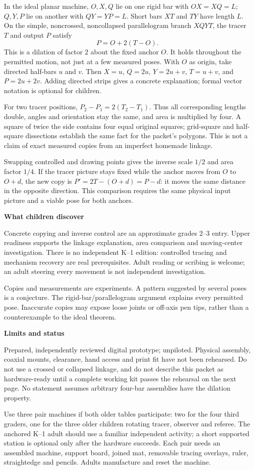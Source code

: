 \documentclass[11pt,letterpaper]{article}
\newcommand{\heading}[1]{\par\vspace{4pt}{\large\bfseries #1}\par}
\newcommand{\sub}[1]{\par\textbf{#1}\par}
\begin{document}
\heading{Mathematical overview}
In the ideal planar machine, $O,X,Q$ lie on one rigid bar with $OX=XQ=L$; $Q,Y,P$ lie on another with $QY=YP=L$. Short bars $XT$ and $TY$ have length $L$. On the simple, noncrossed, noncollapsed parallelogram branch $XQYT$, the tracer $T$ and output $P$ satisfy
\[
 P=O+2(T-O).
\]
This is a dilation of factor 2 about the fixed anchor $O$. It holds throughout the permitted motion, not just at a few measured poses. With $O$ as origin, take directed half-bars $u$ and $v$. Then $X=u$, $Q=2u$, $Y=2u+v$, $T=u+v$, and $P=2u+2v$. Adding directed strips gives a concrete explanation; formal vector notation is optional for children.

For two tracer positions, $P_2-P_1=2(T_2-T_1)$. Thus all corresponding lengths double, angles and orientation stay the same, and area is multiplied by four. A square of twice the side contains four equal original squares; grid-square and half-square dissections establish the same fact for the packet's polygons. This is not a claim of exact measured copies from an imperfect homemade linkage.

Swapping controlled and drawing points gives the inverse scale $1/2$ and area factor $1/4$. If the tracer picture stays fixed while the anchor moves from $O$ to $O+d$, the new copy is $P'=2T-(O+d)=P-d$: it moves the same distance in the opposite direction. This comparison requires the same physical input picture and a viable pose for both anchors.

\sub{What children discover}
Concrete copying and inverse control are an approximate grades 2--3 entry. Upper readiness supports the linkage explanation, area comparison and moving-center investigation. There is no independent K--1 edition: controlled tracing and mechanism recovery are real prerequisites. Adult reading or scribing is welcome; an adult steering every movement is not independent investigation.

Copies and measurements are experiments. A pattern suggested by several poses is a conjecture. The rigid-bar/parallelogram argument explains every permitted pose. Inaccurate copies may expose loose joints or off-axis pen tips, rather than a counterexample to the ideal theorem.

\sub{Limits and status}
Prepared, independently reviewed digital prototype; unpiloted. Physical assembly, coaxial mounts, clearance, hand access and print fit have not been rehearsed. Do not use a crossed or collapsed linkage, and do not describe this packet as hardware-ready until a complete working kit passes the rehearsal on the next page. No statement assumes arbitrary four-bar assemblies have the dilation property.
\newpage
\heading{Preparation and the first visit}
Use three pair machines if both older tables participate: two for the four third graders, one for the three older children rotating tracer, observer and referee. The anchored K--1 adult should use a familiar independent activity; a short supported station is optional only after the hardware succeeds. Each pair needs an assembled machine, support board, joined mat, removable tracing overlays, ruler, straightedge and pencils. Adults manufacture and reset the machine.
\end{document}
